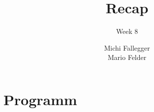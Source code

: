 \documentclass{beamer}
\title{Recap}
\subtitle{Week 8}
\author{Michi Fallegger\\ Mario Felder}
\begin{document}
\maketitle


\section*{Programm}
\begin{frame}
\tableofcontents
\end{frame}




\end{document}
